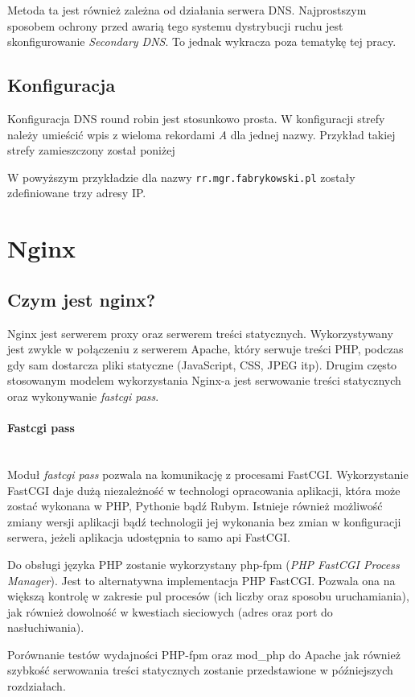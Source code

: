 {Metoda ta jest również zależna od działania serwera DNS.
Najprostszym sposobem ochrony przed awarią tego systemu dystrybucji ruchu jest skonfigurowanie \textit{Secondary DNS}. To jednak wykracza poza tematykę tej pracy.
\subsection{Konfiguracja}
Konfiguracja DNS round robin jest stosunkowo prosta.
W konfiguracji strefy należy umieścić wpis z wieloma rekordami \textit{A} dla jednej nazwy.
Przykład takiej strefy zamieszczony został poniżej

W powyższym przykładzie dla nazwy \texttt{rr.mgr.fabrykowski.pl} zostały zdefiniowane trzy adresy IP.
\section{Nginx}
\subsection{Czym jest nginx?}
Nginx jest serwerem proxy oraz serwerem treści statycznych.
Wykorzystywany jest zwykle w połączeniu z serwerem Apache, który serwuje treści PHP, podczas gdy sam dostarcza pliki statyczne (JavaScript, CSS, JPEG itp).
Drugim często stosowanym modelem wykorzystania Nginx-a jest serwowanie treści statycznych oraz wykonywanie \textit{fastcgi pass}.
\paragraph{Fastcgi pass} \hspace{0pt} \\
Moduł \textit{fastcgi pass} pozwala na komunikację z procesami FastCGI.
Wykorzystanie FastCGI daje dużą niezależność w technologi opracowania aplikacji, która może zostać wykonana w PHP, Pythonie bądź Rubym.
Istnieje również możliwość zmiany wersji aplikacji bądź technologii jej wykonania bez zmian w konfiguracji serwera, jeżeli aplikacja udostępnia to samo api FastCGI.

Do obsługi języka PHP zostanie wykorzystany php-fpm (\textit{PHP FastCGI Process Manager}).
Jest to alternatywna implementacja PHP FastCGI.
Pozwala ona na większą kontrolę w zakresie pul procesów (ich liczby oraz sposobu uruchamiania), jak również dowolność w kwestiach sieciowych (adres oraz port do nasłuchiwania).

Porównanie testów wydajności PHP-fpm oraz mod\_php do Apache jak również szybkość serwowania treści statycznych zostanie przedstawione w późniejszych rozdziałach.
}

